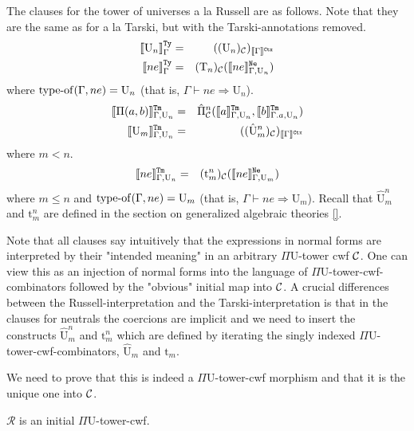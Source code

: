 \documentclass{lmcs}
\def\UU{\mathrm{U}}
\def\Ta{\mathrm{T}}
\def\Pihat{\hat{\Pi}}
\def\UUhat{\hat{\UU}}
\def\t{\mathrm{t}}
\def\RawNe{\texttt{Ne}}
\def\var{\mathrm{var}}
\def\Ty{\mathrm{Ty}}
\def\Tm{\mathrm{Tm}}
\def\p{\mathrm{p}}
\def\R{\mathcal{R}}
\newcommand{\intCtxU}[1]{\llbracket #1 \rrbracket^\RawCtx}
\newcommand{\intTyU}[1]{\llbracket #1 \rrbracket^\RawTy}
\newcommand{\intTmU}[1]{\llbracket #1 \rrbracket^\RawTm}
\newcommand{\intNeU}[1]{\llbracket #1 \rrbracket^\RawNe}
\begin{document}
The clauses for the tower of universes a la Russell are as follows. Note that they are the same as for a la Tarski, but with the Tarski-annotations removed.
\begin{eqnarray*}
\intTyU{\UU_n}_\Gamma &=& ((\UU_n)_\C)_{\intCtxU{\Gamma}}\\ %
\intTyU{ne}_\Gamma &=& (\Ta_n)_\C(\intNeU{ne}_{\Gamma,\UU_n})
\end{eqnarray*}
where $\typeof(\Gamma,ne) = \UU_n$ (that is, $\Gamma \vdash ne \Rightarrow \UU_n$).
\begin{eqnarray*}
\intTmU{\Pi(a,b)}_{\Gamma,\UU_n}&=& \Pihat^n_\C(\intTmU{a}_{\Gamma,\UU_n},\intTmU{b}_{\Gamma.a,\UU_n})\\%
\intTmU{\UU_m}_{\Gamma,\UU_n} &=& ((\UUhat^n_m)_\C)_{\intCtxU{\Gamma}}
\end{eqnarray*}
where $m < n$.
\begin{eqnarray*}
\intTmU{ne}_{\Gamma,\UU_n} &=& 
(\t^n_m)_\C(\intNeU{ne}_{\Gamma,\UU_m})%
\end{eqnarray*}
where $m \leq n$ and $\typeof(\Gamma,ne) = \UU_m$ (that is, $\Gamma \vdash ne \Rightarrow \UU_m$). Recall that $\UUhat^n_m$ and $\t^n_m$ are defined in the section on generalized algebraic theories \ref{}.

Note that all clauses say intuitively that the expressions in normal forms are interpreted by their "intended meaning" in an arbitrary $\Pi\UU$-tower cwf ${\mathcal C}$. One can view this as an injection of normal forms into the language of $\Pi\UU$-tower-cwf-combinators followed by the "obvious" initial map into ${\mathcal C}$. A crucial differences between the Russell-interpretation and the Tarski-interpretation is that in the clauses for neutrals the coercions are implicit and we need to insert the constructs $\UUhat^n_m$ and $\t^n_m$ which are defined by iterating the singly indexed $\Pi\UU$-tower-cwf-combinators, $\UUhat_m$ and $\t_m$.

We need to prove that this is indeed a $\Pi\UU$-tower-cwf morphism and that it is the unique one into ${\mathcal C}$.
\begin{thm}\label{theom:initial_cwf}
  $\R$ is an initial $\Pi\UU$-tower-cwf.
\end{thm}

%
\end{document}
